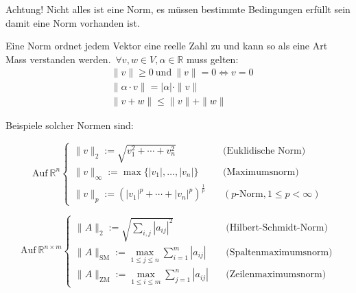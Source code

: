 Achtung! Nicht alles ist eine Norm, es müssen bestimmte Bedingungen erfüllt sein damit eine Norm vorhanden ist.

\begin{tcolorbox}[colback=gray!30, colframe=gray!80, title=Vektornormen]
    Eine Norm ordnet jedem Vektor eine reelle Zahl zu und kann so als eine Art Mass verstanden werden.\ \( \forall v, w \in V, \alpha \in \mathbb{R} \) muss gelten:
    \begin{equation*}
        \begin{aligned}
            & \| v \| \geq 0 \ \text{und} \ \| v \| = 0 \Leftrightarrow v = 0 \\[0.5em]
            & \| \alpha \cdot v \| = |\alpha| \cdot \| v \| \\[0.5em]
            & \| v + w \| \leq \| v \| + \| w \|
        \end{aligned}
    \end{equation*}
\end{tcolorbox}

\vspace{0.5\baselineskip}

Beispiele solcher Normen sind:

\begin{equation*}
    \text{Auf} \ \mathbb{R}^n \left\{ 
    \begin{array}{ll}  
        \| v \|_2 := \sqrt{v_1^2 + \cdots + v_n^2} \quad &\text{(Euklidische Norm)}\\[0.75em]
        \| v \|_\infty := \max \{ |v_1|, \ldots, |v_n| \} \quad &\text{(Maximumsnorm)}\\[0.75em]
        \| v \|_p := \left( |v_1|^p + \cdots + |v_n|^p \right)^{\frac{1}{p}} \quad &(p\text{-Norm}, 1\leq p < \infty)
    \end{array}
\right. 
\end{equation*}

\vspace{0.5\baselineskip}

\begin{equation*}
    \text{Auf} \ \mathbb{R}^{n \times m} \left\{ 
    \begin{array}{ll}  
        \| A \|_2 := \sqrt{\sum_{i,j}|a_{ij}|^2} \quad &\text{(Hilbert-Schmidt-Norm)}\\[0.75em]
        \| A \|_{\text{SM}} := \underset{1 \leq j \leq n}{\max} \sum_{i=1}^{m} | a_{ij} | \quad &\text{(Spaltenmaximumsnorm)}\\[0.75em]
        \| A \|_{\text{ZM}} := \underset{1 \leq i \leq m}{\max} \sum_{j=1}^{n} | a_{ij} | \quad &\text{(Zeilenmaximumsnorm)}
    \end{array}
\right. 
\end{equation*}

